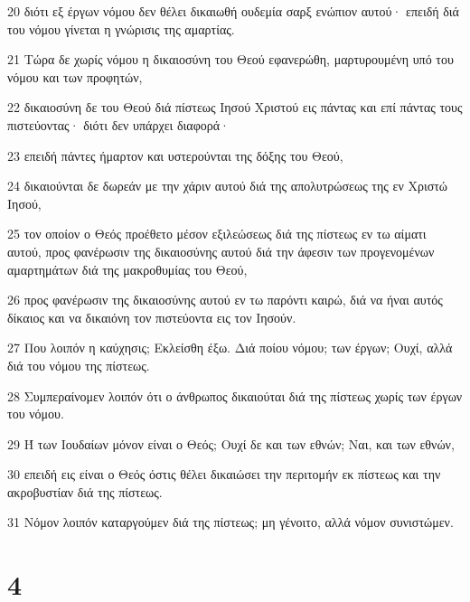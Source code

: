 \par 20 διότι εξ έργων νόμου δεν θέλει δικαιωθή ουδεμία σαρξ ενώπιον αυτού· επειδή διά του νόμου γίνεται η γνώρισις της αμαρτίας.
\par 21 Τώρα δε χωρίς νόμου η δικαιοσύνη του Θεού εφανερώθη, μαρτυρουμένη υπό του νόμου και των προφητών,
\par 22 δικαιοσύνη δε του Θεού διά πίστεως Ιησού Χριστού εις πάντας και επί πάντας τους πιστεύοντας· διότι δεν υπάρχει διαφορά·
\par 23 επειδή πάντες ήμαρτον και υστερούνται της δόξης του Θεού,
\par 24 δικαιούνται δε δωρεάν με την χάριν αυτού διά της απολυτρώσεως της εν Χριστώ Ιησού,
\par 25 τον οποίον ο Θεός προέθετο μέσον εξιλεώσεως διά της πίστεως εν τω αίματι αυτού, προς φανέρωσιν της δικαιοσύνης αυτού διά την άφεσιν των προγενομένων αμαρτημάτων διά της μακροθυμίας του Θεού,
\par 26 προς φανέρωσιν της δικαιοσύνης αυτού εν τω παρόντι καιρώ, διά να ήναι αυτός δίκαιος και να δικαιόνη τον πιστεύοντα εις τον Ιησούν.
\par 27 Που λοιπόν η καύχησις; Εκλείσθη έξω. Διά ποίου νόμου; των έργων; Ουχί, αλλά διά του νόμου της πίστεως.
\par 28 Συμπεραίνομεν λοιπόν ότι ο άνθρωπος δικαιούται διά της πίστεως χωρίς των έργων του νόμου.
\par 29 Ή των Ιουδαίων μόνον είναι ο Θεός; Ουχί δε και των εθνών; Ναι, και των εθνών,
\par 30 επειδή εις είναι ο Θεός όστις θέλει δικαιώσει την περιτομήν εκ πίστεως και την ακροβυστίαν διά της πίστεως.
\par 31 Νόμον λοιπόν καταργούμεν διά της πίστεως; μη γένοιτο, αλλά νόμον συνιστώμεν.

\chapter{4}

